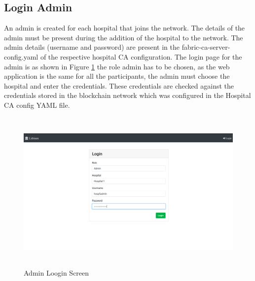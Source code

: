 \subsection{Login Admin}
An admin is created for each hospital that joins the network. The details of the admin must be present during the addition of the hospital to the network. The admin details (username and password) are present in the fabric-ca-server-config.yaml of the respective hospital CA configuration. The login page for the admin is as shown in Figure \ref{fig:chapter03:admin1} the role admin has to be chosen, as the web application is the same for all the participants, the admin must choose the hospital and enter the credentials. These credentials are checked against the credentials stored in the blockchain network which was configured in the Hospital CA config YAML file.
\begin{figure}[htbp]
 \centering
 \includegraphics[height=8cm]{gfx/figures/admin1.png}
 \caption{Admin Loogin Screen}
 \label{fig:chapter03:admin1}
\end{figure}

